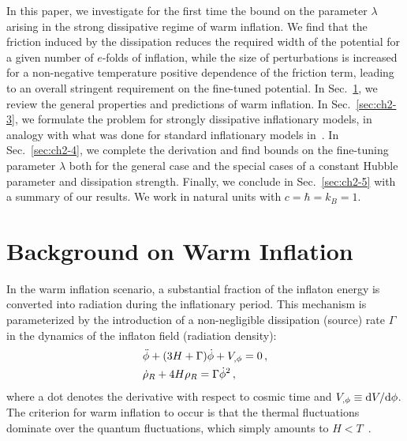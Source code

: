 In this paper, we investigate for the first time the bound on the parameter $\lambda$ arising in the strong dissipative regime of warm inflation. We find that the friction induced by the dissipation reduces the required width of the potential for a given number of $e$-folds of inflation, while the size of perturbations is increased for a non-negative temperature positive dependence of the friction term, leading to an overall stringent requirement on the fine-tuned potential. In Sec.~\ref{sec:ch2-2}, we review the general properties and predictions of warm inflation. In Sec.~\ref{sec:ch2-3}, we formulate the problem for strongly dissipative inflationary models, in analogy with what was done for standard inflationary models in~\citep{Adams:1990pn}. In Sec.~\ref{sec:ch2-4}, we complete the derivation and find bounds on the fine-tuning parameter $\lambda$ both for the general case and the special cases of a constant Hubble parameter and dissipation strength. Finally, we conclude in Sec.~\ref{sec:ch2-5} with a summary of our results. We work in natural units with $c = \hbar = k_B = 1$.

\section{Background on Warm Inflation}\label{sec:ch2-2}

In the warm inflation scenario, a substantial fraction of the inflaton energy is converted into radiation during the inflationary period. This mechanism is parameterized by the introduction of a non-negligible dissipation (source) rate $\Gamma$ in the dynamics of the inflaton field (radiation density):
\begin{align}
    &\Ddot{\phi}+(3H+\Gamma)\dot{\phi}+V_{,\phi}=0\,,\label{eq:ch2-2.1} \\
    &\Dot{\rho}_R+4H\rho_R=\Gamma \Dot{\phi}^2\,,  \label{eq:ch2-2.2}
\end{align}
where a dot denotes the derivative with respect to cosmic time and $V_{,\phi} \equiv {\rm d} V/{\rm d} \phi$. The criterion for warm inflation to occur is that the thermal fluctuations dominate over the quantum fluctuations, which simply amounts to $H<T$~\citep{Berera:1995ie}.


